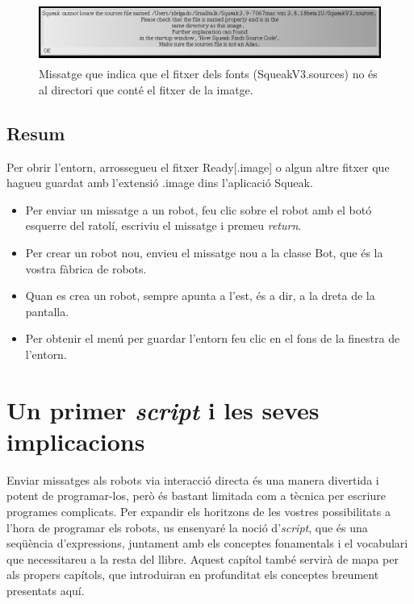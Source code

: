 \begin{figure}[h]
\begin{center}
\includegraphics[height=20mm ,width=133mm ]{Imatges/figura1-13.png}
\end{center}
\caption{Missatge que indica que el fitxer dels fonts (\textsf{\upshape SqueakV3.sources}) no és al directori que conté el fitxer de la imatge.}
\label{fig0113}
\end{figure}
\newpage

\section{Resum}

Per obrir l'entorn, arrossegueu el fitxer \textsf{Ready}[\textsf{.image}] o algun altre fitxer que hagueu guardat amb l'extensió \textsf{.image} dins l'aplicació \textsf{Squeak}.

\begin{itemize}
\item Per enviar un missatge a un robot, feu clic sobre el robot amb el botó esquerre del ratolí, escriviu el missatge i premeu \emph{return}.
\item Per crear un robot nou, envieu el missatge \textsf{nou} a la classe \textsf{Bot}, que és la vostra fàbrica de robots.
\item Quan es crea un robot, sempre apunta a l'\textsf{est}, és a dir, a la dreta de la pantalla.
\item Per obtenir el menú per guardar l'entorn feu clic en el fons de la finestra de l'entorn.
\end{itemize}

 \chapter{Un primer \emph{script} i les seves implicacions}
\label{cap2}

Enviar missatges als robots via interacció directa és una manera divertida i potent de programar-los, però és bastant limitada com a tècnica per escriure programes complicats. Per expandir els horitzons de les vostres possibilitats a l'hora de programar els robots, us ensenyaré la noció d'\emph{script}, que és una seqüència d'expressions, juntament amb els conceptes fonamentals i el vocabulari que necessitareu a la resta del llibre. Aquest capítol també servirà de mapa per als propers capítols, que introduiran en profunditat els conceptes breument presentats aquí. 

